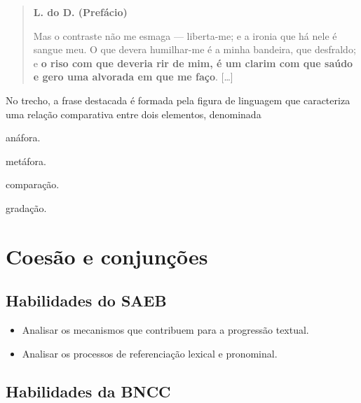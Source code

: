 \begin{quote}
\textbf{L. do D. (Prefácio)}


Mas o contraste não me esmaga --- liberta-me; e a ironia que há nele é
sangue meu. O que devera humilhar-me é a minha bandeira, que desfraldo;
e \textbf{o riso com que deveria rir de mim, é um clarim com que saúdo e
gero uma alvorada em que me faço}. {[}\ldots{}{]}

\end{quote}

No trecho, a frase destacada é formada pela figura de linguagem que
caracteriza uma relação comparativa entre dois elementos, denominada

\begin{escolha}
\item anáfora.

\item metáfora.

\item comparação.

\item gradação.

\end{escolha}

\chapter{Coesão e conjunções}

\section{Habilidades do SAEB}

\begin{itemize}
\item Analisar os mecanismos que contribuem para a progressão textual.

\item Analisar os processos de referenciação lexical e pronominal.
\end{itemize}

\section{Habilidades da BNCC}

